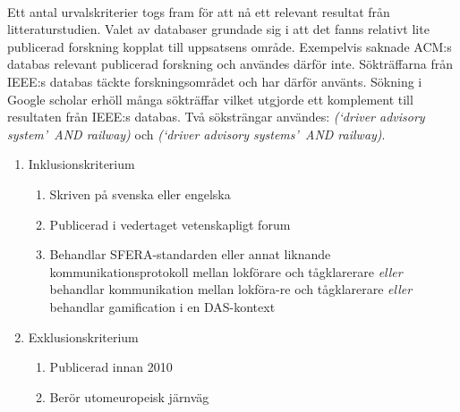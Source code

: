 \paragraph{}
\hspace{-11pt}Ett antal urvalskriterier togs fram för att nå ett relevant resultat från litteraturstudien.
Valet av databaser grundade sig i att det fanns relativt lite publicerad forskning kopplat till uppsatsens område.
Exempelvis saknade ACM:s databas relevant publicerad forskning och användes därför inte.
Sökträffarna från IEEE:s databas täckte forskningsområdet och har därför använts.
Sökning i Google scholar erhöll många sökträffar vilket utgjorde ett komplement till resultaten från IEEE:s databas.
Två söksträngar användes: \emph{(\lq driver advisory system\rq~AND railway)} och \emph{(\lq driver advisory systems\rq~AND railway)}.
\begin{enumerate}
    \item Inklusionskriterium
    \begin{enumerate}
        \item Skriven på svenska eller engelska
        \item Publicerad i vedertaget vetenskapligt forum
        \item Behandlar SFERA-standarden eller annat liknande kommunikationsprotokoll mellan lokförare och tågklarerare \emph{eller} behandlar kommunikation mellan lokföra-re och tågklarerare \emph{eller} behandlar gamification i en DAS-kontext
    \end{enumerate}
    \item Exklusionskriterium
    \begin{enumerate}
        \item Publicerad innan 2010
        \item Berör utomeuropeisk järnväg
    \end{enumerate}
\end{enumerate}

